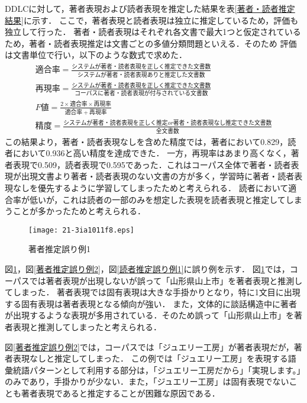 \documentclass[japanese]{jnlp_1.4}
\begin{document}
DDLCに対して，著者表現および読者表現を推定した結果を表\ref{著者・読者推定結果}に示す．
ここで，著者表現と読者表現は独立に推定しているため，評価も独立して行った．
著者・読者表現はそれぞれ各文書で最大1つと仮定されているため，著者・読者表現推定は文書ごとの多値分類問題といえる．そのため
評価は文書単位で行い，以下のような数式で求めた．
\pagebreak
\begin{gather*}
 適合率 = \frac{システムが著者・読者表現を正しく推定できた文書数}{システムが著者・読者表現ありと推定した文書数}  \\[0.5zw]
 再現率 = \frac{システムが著者・読者表現を正しく推定できた文書数}{コーパスに著者・読者表現が付与されている文書数} \\[0.5zw]
 F値 = \frac{2 \times 適合率  \times 再現率}{適合率 + 再現率} \\[0.5zw]
 精度 = \frac{システムが著者・読者表現を正しく推定or著者・読者表現なし推定できた文書数}{全文書数} 
\end{gather*}
この結果より，著者・読者表現なしを含めた精度では，著者において0.829，読者において0.936と高い精度を達成できた．
一方，再現率はあまり高くなく，著者表現で0.509，読者表現で0.595であった．これはコーパス全体で著者・読者表現が出現文書より著者・読者表現のない文書の方が多く，学習時に著者・読者表現なしを優先するように学習してしまったためと考えられる．
読者において適合率が低いが，これは読者の一部のみを想定した表現を読者表現と推定してしまうことが多かったためと考えられる．

\begin{figure}[b]
\texttt{[image: 21-3ia1011f8.eps]}
\caption{著者推定誤り例1}
\label{著者推定誤り例1}
\end{figure}

図\ref{著者推定誤り例1}，図\ref{著者推定誤り例2}，図\ref{読者推定誤り例1}に誤り例を示す．
図\ref{著者推定誤り例1}では，コーパスでは著者表現が出現しないが誤って「山形県山上市」を著者表現と推測してしまった．
著者表現では固有表現は大きな手掛かりとなり，特に1文目に出現する固有表現は著者表現となる傾向が強い．
また，文体的に談話構造中に著者が出現するような表現が多用されている．そのため誤って「山形県山上市」を著者表現と推測してしまったと考えられる．

図\ref{著者推定誤り例2}では，コーパスでは「ジュエリー工房」が著者表現だが，著者表現なしと推定してしまった．
この例では「ジュエリー工房」を表現する語彙統語パターンとして利用する部分は，「ジュエリー工房だから」「実現します。」のみであり，手掛かりが少ない．また，「ジュエリー工房」は固有表現でないことも著者表現であると推定することが困難な原因である．
\end{document}
